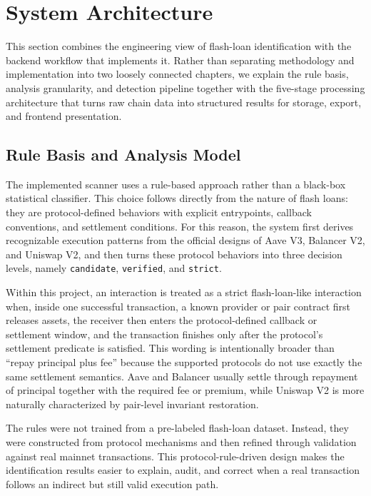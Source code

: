 \section{System Architecture}

This section combines the engineering view of flash-loan identification with the backend workflow that implements it. Rather than separating methodology and implementation into two loosely connected chapters, we explain the rule basis, analysis granularity, and detection pipeline together with the five-stage processing architecture that turns raw chain data into structured results for storage, export, and frontend presentation.

\subsection{Rule Basis and Analysis Model}

The implemented scanner uses a rule-based approach rather than a black-box statistical classifier. This choice follows directly from the nature of flash loans: they are protocol-defined behaviors with explicit entrypoints, callback conventions, and settlement conditions. For this reason, the system first derives recognizable execution patterns from the official designs of Aave V3, Balancer V2, and Uniswap V2, and then turns these protocol behaviors into three decision levels, namely \texttt{candidate}, \texttt{verified}, and \texttt{strict}.

Within this project, an interaction is treated as a strict flash-loan-like interaction when, inside one successful transaction, a known provider or pair contract first releases assets, the receiver then enters the protocol-defined callback or settlement window, and the transaction finishes only after the protocol's settlement predicate is satisfied. This wording is intentionally broader than ``repay principal plus fee'' because the supported protocols do not use exactly the same settlement semantics. Aave and Balancer usually settle through repayment of principal together with the required fee or premium, while Uniswap V2 is more naturally characterized by pair-level invariant restoration.

The rules were not trained from a pre-labeled flash-loan dataset. Instead, they were constructed from protocol mechanisms and then refined through validation against real mainnet transactions. This protocol-rule-driven design makes the identification results easier to explain, audit, and correct when a real transaction follows an indirect but still valid execution path.

